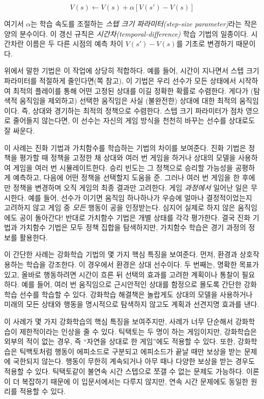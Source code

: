 \begin{equation*}
V(s) \leftarrow V(s) + \alpha[V(s')-V(s)]
\end{equation*}

여기서 $\alpha$는 학습 속도를 조절하는 \emph{스텝 크기 파라미터(step-size
parameter)}라는 작은 양의 분수이다. 이 갱신 규칙은
\emph{시간차(temporal-difference)} 학습 기법의 일종이다. 시간차란 이름은 두 다른
시점의 예측 차이 $V(s') - V(s)$를 기초로 변경하기 때문이다.

위에서 말한 기법은 이 작업에 상당히 적합하다. 예를 들어, 시간이 지나면서 스텝
크기 파라미터를 적절하게 줄인다면(\pageref{varying-step-size-parameter}쪽 참고),
이 기법은 우리 선수가 모든 상태에서 시작하여 최적의 플레이를 통해 어떤 고정된
상대를 이길 정확한 확률로 수렴한다. 게다가 (탐색적 움직임을 제외하고) 선택한
움직임은 사실 (불완전한) 상대에 대한 최적의 움직임이다. 즉, 상대와 경기하는
최적의 정책으로 수렴한다. 스텝 크기 파라미터가 점차 영으로 줄어들지 않는다면,
이 선수는 자신의 게임 방식을 천천히 바꾸는 선수를 상대로도 잘 싸운다.


이 사례는 진화 기법과 가치함수를 학습하는 기법의 차이를 보여준다. 진화 기법은
정책을 평가할 때 정책을 고정한 채 상대와 여러 번 게임을 하거나 상대의 모델을
사용하여 게임을 여러 번 시뮬레이트한다. 승리 빈도는 그 정책으로 승리할 가능성을
공평하게 예측하고, 다음에 어떤 정책을 선택할지 도움을 준. 그러나 여러 번 게임을
한 후에만 정책을 변경하며 오직 게임의 최종 결과만 고려한다. 게임 \emph{과정에서}
일어난 일은 무시한다. 예를 들어, 선수가 이기면 움직임 하나하나가 우승에 얼마나
결정적이었는지 고려하지 않고 게임 중 \emph{모든} 행동이 공을 인정받는다. 심지어
실제로 하지 않은 움직임에도 공이 돌아간다! 반대로 가치함수 기법은 개별 상태를
각각 평가한다. 결국 진화 기법과 가치함수 기법은 모두 정책 집합을 탐색하지만,
가치함수 학습은 경기 과정의 정보를 활용한다.

이 간단한 사례는 강화학습 기법의 몇 가지 핵심 특징을 보여준다. 먼저, 환경과
상호작용하는 학습을 강조한다. 이 경우에서 환경은 상대 선수이다. 두 번째는,
명확한 목표가 있고, 올바로 행동하려면 시간이 흐른 뒤 선택의 효과를 고려한
계획이나 통찰이 필요하다. 예를 들어, 여러 번 움직임으로 근시안적인 상대를
함정으로 몰도록 간단한 강화학습 선수를 학습할 수 있다. 강화학습 해결책은
놀랍게도 상대의 모델을 사용하거나 미래의 모든 상태와 행동을 명시적으로 탐색하지
않고도 계획과 선견지명 효과를 낸다.


이 사례가 몇 가지 강화학습의 핵심 특징을 보여주지만, 사례가 너무 단순해서
강화학습이 제한적이라는 인상을 줄 수 있다. 틱택토는 두 명이 하는 게임이지만,
강화학습은 외부의 적이 없는 경우, 즉 ``자연을 상대로 한 게임''에도 적용할 수
있다. 또한, 강화학습은 틱백토처럼 행동이 에피소드로 구분되고 에피소드가 끝날
때만 보상을 받는 문제에 국한되지 않는다. 행동이 무한히 계속되거나 아무 때나
다양한 보상을 받는 경우도 적용할 수 있다. 틱택토같이 불연속 시간 스텝으로 쪼갤
수 없는 문제도 가능하다. 이론이 더 복잡하기 때문에 이 입문서에서는 다루지
않지만, 연속 시간 문제에도 동일한 원리를 적용할 수 있다.

